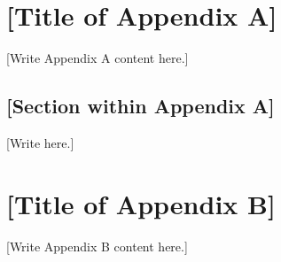 %

\appendix

\clearoddpage
\chapter{[Title of Appendix A]}
\label{app:A}


[Write Appendix A content here.]

\section{[Section within Appendix A]}

[Write here.]

\clearoddpage
\chapter{[Title of Appendix B]}
\label{app:B}


[Write Appendix B content here.]
